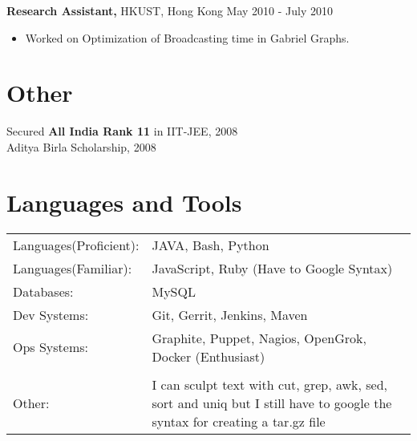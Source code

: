 \documentclass[margin]{res}
\begin{document}
\begin{resume}
 {\bf Research Assistant,} HKUST, Hong Kong \hfill May  2010  - July  2010
 \begin{itemize} \itemsep -2pt  %
 \item Worked  on  Optimization  of  Broadcasting  time  in  Gabriel  Graphs.
 \end{itemize}





\section{Other}
 Secured {\bf All India Rank 11} in IIT-JEE, 2008 \\
Aditya Birla Scholarship, 2008 \\



\section{Languages and Tools}
   \begin{tabular}{l p{3in}}
    {Languages(Proficient):} & JAVA, Bash, Python \\
    {Languages(Familiar):} &  JavaScript, Ruby (Have to Google Syntax) \\
    {Databases:} &  MySQL \\
    {Dev Systems:} &  Git, Gerrit, Jenkins, Maven \\
    {Ops Systems:} &  Graphite, Puppet, Nagios, OpenGrok, Docker (Enthusiast) \\

    {} &   \\
    {Other:} & I can sculpt text with cut, grep, awk, sed, sort and uniq but I still have to google the syntax for creating a tar.gz file \\

 \end{tabular}


\bigskip
\bigskip


\end{resume}
\end{document}
